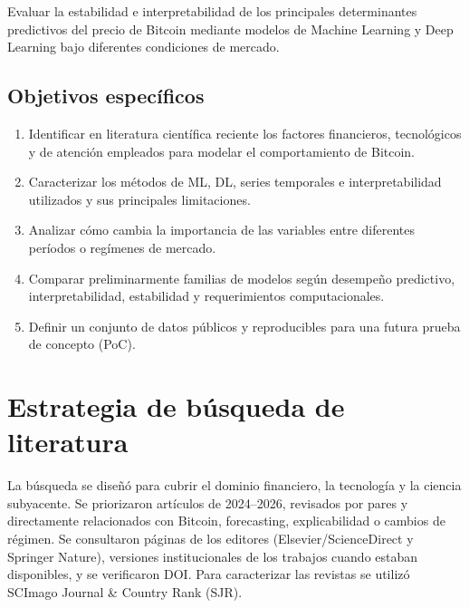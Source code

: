 \documentclass[11pt,letterpaper]{article}
\begin{document}
Evaluar la estabilidad e interpretabilidad de los principales determinantes predictivos del precio de Bitcoin mediante modelos de Machine Learning y Deep Learning bajo diferentes condiciones de mercado.

\subsection{Objetivos específicos}
\begin{enumerate}
  \item Identificar en literatura científica reciente los factores financieros, tecnológicos y de atención empleados para modelar el comportamiento de Bitcoin.
  \item Caracterizar los métodos de ML, DL, series temporales e interpretabilidad utilizados y sus principales limitaciones.
  \item Analizar cómo cambia la importancia de las variables entre diferentes períodos o regímenes de mercado.
  \item Comparar preliminarmente familias de modelos según desempeño predictivo, interpretabilidad, estabilidad y requerimientos computacionales.
  \item Definir un conjunto de datos públicos y reproducibles para una futura prueba de concepto (PoC).
\end{enumerate}

\section{Estrategia de búsqueda de literatura}

La búsqueda se diseñó para cubrir el dominio financiero, la tecnología y la ciencia subyacente. Se priorizaron artículos de 2024--2026, revisados por pares y directamente relacionados con Bitcoin, forecasting, explicabilidad o cambios de régimen. Se consultaron páginas de los editores (Elsevier/ScienceDirect y Springer Nature), versiones institucionales de los trabajos cuando estaban disponibles, y se verificaron DOI. Para caracterizar las revistas se utilizó SCImago Journal \& Country Rank (SJR).
\end{document}
